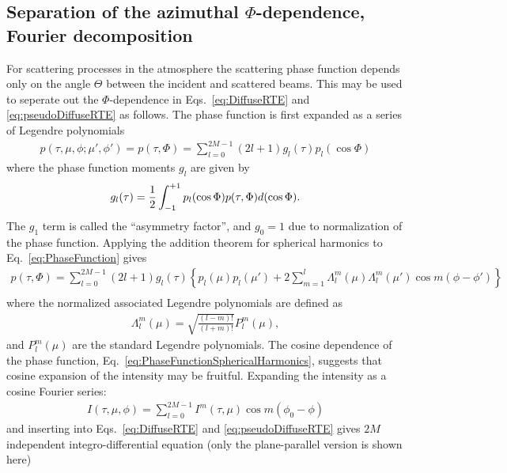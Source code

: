 \subsection{Separation of the azimuthal $\Phi$-dependence, Fourier decomposition}
For scattering processes in the atmosphere the scattering phase
function depends only on the angle $\Theta$ between the incident and
scattered beams. This may be used to seperate out the
$\Phi$-dependence in Eqs.~\ref{eq:DiffuseRTE} and
\ref{eq:pseudoDiffuseRTE} as follows. The phase function is first
expanded as a series of Legendre polynomials
\begin{eqnarray}
  p(\tau,\mu, \phi;\mu', \phi') = p(\tau,\Phi) = \sum_{l=0}^{2M-1}
  (2l+1) g_l(\tau) p_l(\cos\Phi)
  \label{eq:PhaseFunction}
\end{eqnarray}
where the phase function moments $g_l$ are given by
\begin{eqnarray}
  g_l(\tau) = {1 \over 2} \int_{-1}^{+1} p_l(\cos\Phi)p(\tau,\Phi)d(\cos\Phi).
  \label{eq:PhaseFunctionMoment}
\end{eqnarray}
The $g_1$ term is called the ``asymmetry factor'', and $g_0=1$ due to
normalization of the phase function. Applying the addition theorem for
spherical harmonics to Eq.~\ref{eq:PhaseFunction} gives
\begin{eqnarray}
p(\tau,\Phi) = \sum_{l=0}^{2M-1}  (2l+1) g_l(\tau)\left\{
    p_l(\mu) p_l(\mu') + 2\sum_{m=1}^{l} \Lambda_l^m(\mu)
    \Lambda_l^m(\mu') \cos m(\phi-\phi') \right\}\nonumber \\
  \label{eq:PhaseFunctionSphericalHarmonics}
\end{eqnarray}
where the normalized associated Legendre polynomials are defined as
\begin{eqnarray}
  \Lambda_l^m(\mu) = \sqrt{\frac{(l-m)!}{(l+m)!}} P_l^m(\mu),
  \label{eq:NormalizedAssociatedLegendrePolynomial}
\end{eqnarray}
and $P_l^m(\mu)$ are the standard Legendre polynomials. The cosine
dependence of the phase function,
Eq.~\ref{eq:PhaseFunctionSphericalHarmonics}, suggests that cosine
expansion of the intensity may be fruitful. Expanding the intensity as
a cosine Fourier series:
\begin{eqnarray}
  I(\tau,\mu,\phi) = \sum_{l=0}^{2M-1} I^m(\tau,\mu)  \cos m(\phi_0-\phi)
  \label{eq:CosineExpansion}
\end{eqnarray}
and inserting into Eqs.~\ref{eq:DiffuseRTE} and
\ref{eq:pseudoDiffuseRTE} gives $2M$ independent integro-differential
equation (only the plane-parallel version is shown here)
